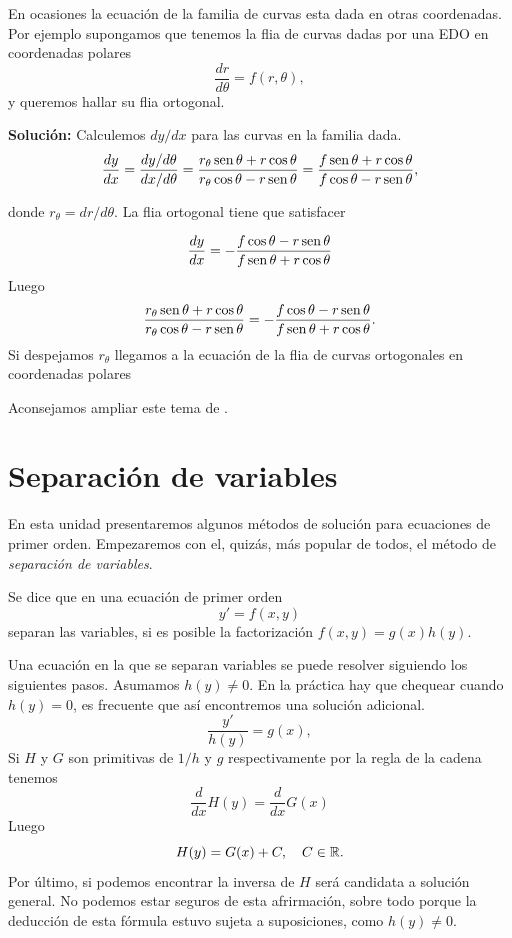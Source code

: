 \begin{problema}
En ocasiones la ecuación de la familia de curvas esta dada en otras coordenadas. Por ejemplo supongamos que tenemos la flia de curvas dadas por una EDO en coordenadas polares
\[\frac{dr}{d\theta}=f(r,\theta)\label{eq:flia_curvas_polar},\]
y queremos hallar su flia ortogonal.
\end{problema}

\noindent\textbf{Solución:} Calculemos $dy/dx$ para las curvas en la familia dada.
\[\frac{dy}{dx}=\frac{dy/d\theta}{dx/d\theta}=\frac{r_{\theta}\sen\theta+r\cos\theta}{r_{\theta}\cos\theta-r\sen\theta}=\frac{f\sen\theta+r\cos\theta}{f\cos\theta-r\sen\theta},\]

donde $r_{\theta}=dr/d\theta$. La flia ortogonal tiene que satisfacer

\[\frac{dy}{dx}=-\frac{f\cos\theta-r\sen\theta}{f\sen\theta+r\cos\theta}\]
Luego
\[\frac{r_{\theta}\sen\theta+r\cos\theta}{r_{\theta}\cos\theta-r\sen\theta}=-\frac{f\cos\theta-r\sen\theta}{f\sen\theta+r\cos\theta}.\]
Si despejamos $r_{\theta}$ llegamos a la ecuación de la flia de curvas ortogonales en coordenadas polares


Aconsejamos ampliar este tema de \cite{simmons_esp}. \lectura



\section{Separación de variables}
En esta unidad presentaremos algunos métodos de solución para ecuaciones de primer orden. Empezaremos con el, quizás, más popular de todos, el método de \emph{separación de variables}.

\begin{definicion} Se dice que en una ecuación de primer orden
 \[y'=f(x,y)\]
 separan las variables, si es posible la factorización $f(x,y)=g(x)h(y)$.
\end{definicion}



Una ecuación  en la que se separan variables se puede resolver siguiendo los siguientes pasos. Asumamos $h(y)\neq 0$. En la práctica hay que chequear cuando $h(y)=0$, es frecuente que así encontremos una solución adicional.
\[\frac{y'}{h(y)}=g(x),\]
Si $H$ y $G$ son primitivas de $1/h$ y $g$ respectivamente por la regla de la cadena tenemos
\[\frac{d}{dx}H(y)=\frac{d}{dx}G(x)\]
Luego 
\[H(y)=G(x)+C,\quad C\in\rr.\]
Por último, si podemos encontrar la inversa de $H$
será candidata a solución general. No podemos estar seguros de esta afrirmación, sobre todo porque la deducción de esta fórmula estuvo sujeta a suposiciones, como $h(y)\neq 0$.



